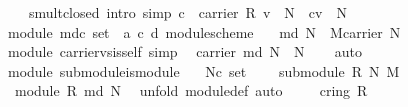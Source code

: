 \begin{isabellebody}
\ \ \ \ \ smult{\isacharunderscore}closed\ {\isacharbrackleft}intro{\isacharcomma}\ simp{\isacharbrackright}{\isacharcolon}\ {\isachardoublequoteopen}{\isasymlbrakk}c\ {\isasymin}\ carrier\ R{\isacharsemicolon}\ v\ {\isasymin}\ N{\isasymrbrakk}\ {\isasymLongrightarrow}\ c{\isasymodot}v\ {\isasymin}\ N{\isachardoublequoteclose}\isanewline
\isanewline
{}\isamarkupfalse%
\ {\isacharparenleft}\ module{\isacharparenright}\ md{\isacharcolon}{\isacharcolon}{\isachardoublequoteopen}{\isacharprime}c\ set\ {\isasymRightarrow}\ {\isacharparenleft}{\isacharprime}a{\isacharcomma}\ {\isacharprime}c{\isacharcomma}\ {\isacharprime}d{\isacharparenright}\ module{\isacharunderscore}scheme{\isachardoublequoteclose}\isanewline
\ \ \ {\isachardoublequoteopen}md\ N\ {\isasymequiv}\ M{\isasymlparr}carrier\ {\isacharcolon}{\isacharequal}N{\isasymrparr}{\isachardoublequoteclose}\isanewline
\isanewline
{}\isamarkupfalse%
\ {\isacharparenleft}\ module{\isacharparenright}\ carrier{\isacharunderscore}vs{\isacharunderscore}is{\isacharunderscore}self\ {\isacharbrackleft}simp{\isacharbrackright}{\isacharcolon}\isanewline
\ \ {\isachardoublequoteopen}carrier\ {\isacharparenleft}md\ N{\isacharparenright}\ {\isacharequal}\ N{\isachardoublequoteclose}\isanewline
%
\isadelimproof
\ \ %
\endisadelimproof
%
\isatagproof
{}\isamarkupfalse%
\ auto%
\endisatagproof
{\isafoldproof}%
%
\isadelimproof
\isanewline
%
\endisadelimproof
\isanewline
{}\isamarkupfalse%
\ {\isacharparenleft}\ module{\isacharparenright}\ submodule{\isacharunderscore}is{\isacharunderscore}module{\isacharcolon}\isanewline
\ \ \ N{\isacharcolon}{\isacharcolon}{\isachardoublequoteopen}{\isacharprime}c\ set{\isachardoublequoteclose}\isanewline
\ \ \ {}{\isacharcolon}\ {\isachardoublequoteopen}submodule\ R\ N\ M{\isachardoublequoteclose}\isanewline
\ \ \ {\isachardoublequoteopen}module\ R\ {\isacharparenleft}md\ N{\isacharparenright}{\isachardoublequoteclose}\isanewline
%
\isadelimproof
%
\endisadelimproof
%
\isatagproof
{}\isamarkupfalse%
\ \ {\isacharparenleft}unfold\ module{\isacharunderscore}def{\isacharcomma}\ auto{\isacharparenright}\isanewline
\ \ \isamarkupfalse%
\ {}{\isacharcolon}\ {\isachardoublequoteopen}cring\ R{\isachardoublequoteclose}\isacommand{{\isachardot}{\isachardot}}\isamarkupfalse%
\isanewline
{}\isamarkupfalse%
\isanewline
\ \ \isamarkupfalse%

\end{isabellebody}
